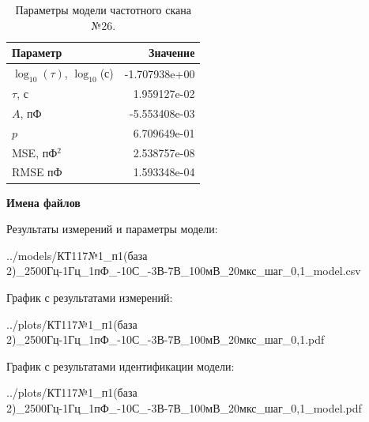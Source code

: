 \begin{table}[!ht]
    \centering
    \caption{Параметры модели частотного скана №26.}
    \begin{tabular}{|l|r|}
        \hline
        Параметр                                       & Значение                  \\ \hline
        $\log_{10}(\tau)$, $\log_{10}$(с)              & -1.707938e+00             \\ \hline
        $\tau$, с                                      & 1.959127e-02              \\ \hline
        $A$, пФ                                        & -5.553408e-03             \\ \hline
        $p$                                            & 6.709649e-01              \\ \hline
        MSE, пФ$^2$                                    & 2.538757e-08              \\ \hline
        RMSE пФ                                        & 1.593348e-04              \\ \hline
    \end{tabular}
    \label{table:frequency_scan_model_26}
\end{table}

\textbf{Имена файлов}

Результаты измерений и параметры модели:

\scriptsize../models/КТ117№1\_п1(база 2)\_2500Гц-1Гц\_1пФ\_-10С\_-3В-7В\_100мВ\_20мкс\_шаг\_0,1\_model.csv
\normalsize

График с результатами измерений:

\scriptsize../plots/КТ117№1\_п1(база 2)\_2500Гц-1Гц\_1пФ\_-10С\_-3В-7В\_100мВ\_20мкс\_шаг\_0,1.pdf
\normalsize

График с результатами идентификации модели:

\scriptsize../plots/КТ117№1\_п1(база 2)\_2500Гц-1Гц\_1пФ\_-10С\_-3В-7В\_100мВ\_20мкс\_шаг\_0,1\_model.pdf
\normalsize

